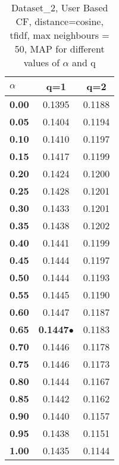 \begin{table}
\begin{center}
\begin{tabular}{ | l || c | c |}
\hline
\textbf{$\alpha$} & \textbf{q=1} & \textbf{q=2} \\
\hline
\textbf{0.00} & 0.1395 & 0.1188\\
\hline
\textbf{0.05} & 0.1404 & 0.1194\\
\hline
\textbf{0.10} & 0.1410 & 0.1197\\
\hline
\textbf{0.15} & 0.1417 & 0.1199\\
\hline
\textbf{0.20} & 0.1424 & 0.1200\\
\hline
\textbf{0.25} & 0.1428 & 0.1201\\
\hline
\textbf{0.30} & 0.1433 & 0.1201\\
\hline
\textbf{0.35} & 0.1438 & 0.1202\\
\hline
\textbf{0.40} & 0.1441 & 0.1199\\
\hline
\textbf{0.45} & 0.1444 & 0.1197\\
\hline
\textbf{0.50} & 0.1444 & 0.1193\\
\hline
\textbf{0.55} & 0.1445 & 0.1190\\
\hline
\textbf{0.60} & 0.1447 & 0.1187\\
\hline
\textbf{0.65} & \textbf{0.1447}$\bullet$ & 0.1183\\
\hline
\textbf{0.70} & 0.1446 & 0.1178\\
\hline
\textbf{0.75} & 0.1446 & 0.1173\\
\hline
\textbf{0.80} & 0.1444 & 0.1167\\
\hline
\textbf{0.85} & 0.1442 & 0.1162\\
\hline
\textbf{0.90} & 0.1440 & 0.1157\\
\hline
\textbf{0.95} & 0.1438 & 0.1151\\
\hline
\textbf{1.00} & 0.1435 & 0.1144\\
\hline
\end{tabular}
\caption{Dataset\_2, User Based CF, distance=cosine, tfidf, max neighbours = 50, MAP for different values of $\alpha$ and q}
\label{table:MAP_Dataset_2_ucf_cosine_tfidf_mnn=50}
\end{center}
\end{table}
